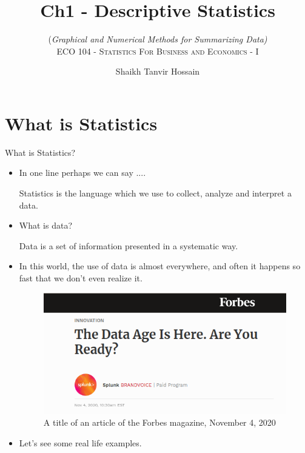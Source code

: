 \documentclass[8pt, usepdftitle=false]{beamer}
\title{\LARGE Ch1 - Descriptive Statistics}
\subtitle{{\fontsize{10}{10}\selectfont\color{gray!50!balck} 
(\rm \itshape Graphical and Numerical Methods for Summarizing Data)}
\\\vspace*{.2cm} \scshape ECO 104 - Statistics For Business and Economics - I}
\author{Shaikh Tanvir Hossain\vspace*{-.4cm}}
\institute{ East West University, Dhaka\\  \today}
\date{\vspace{-5pt}}
\begin{document}




\section{What is Statistics}

\begin{frame}{What is Statistics?}

\begin{itemize}
\item In one line perhaps we can say .... 

\begin{center}
  \alert{Statistics is the language which we use to collect, analyze and interpret a data}.
\end{center}

\item What is data? 

\begin{center}
  \alert{Data is a set of information presented in a systematic way.}
\end{center}

\item In this world, the use of data is almost everywhere, and often it happens so fast that we don't even realize it. 


\begin{figure}
\includegraphics[scale = .4]{Images/data_age.png}
\caption{A title of an article of the Forbes magazine, November 4, 2020}
\end{figure}


\item Let's see some real life examples.

\end{itemize}

\end{frame}
\end{document}
